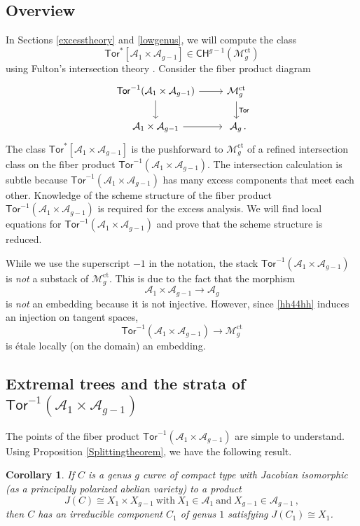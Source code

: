 \documentclass[11pt]{amsart}
\newtheorem{cor}[thm]{Corollary}
\theoremstyle{definition}
\newcommand{\M}{\mathcal{M}}
\newcommand{\A}{\mathcal{A}}
\newcommand{\CH}{\mathsf{CH}}
\DeclareMathOperator{\ct}{ct}
\newcommand{\Tor}{\mathsf{Tor}}
\begin{document}
{\subsection{Overview} In Sections \ref{excesstheory} and  \ref{lowgenus},  we will compute the class 
$$\Tor^*[\A_1\times \A_{g-1}]\in \CH^{g-1}(\M_g^{\ct})$$ using Fulton's intersection theory \cite {Fulton}. Consider the fiber product diagram
\[
\begin{tikzcd}
\Tor^{-1}(\A_1\times \A_{g-1}) \arrow[d] \arrow[r] & \M_g^{\ct} \arrow[d, "\Tor"] \\
\A_1\times \A_{g-1} \arrow[r]       & \ \A_g \, .                       
\end{tikzcd}
\]
The class $\Tor^*[\A_1\times \A_{g-1}]$ is the pushforward to $\M_g^{\ct}$ 
of a refined 
intersection class on the fiber product $\Tor^{-1}(\A_1\times\A_{g-1})$. 
The intersection calculation is subtle because
$\Tor^{-1}(\A_1\times\A_{g-1})$ has many excess components that meet each other.
Knowledge of the scheme structure of the fiber product $\Tor^{-1}(\A_1\times\A_{g-1})$
is required for the excess analysis.  We will find local equations for 
$\Tor^{-1}(\A_1\times \A_{g-1})$ and prove that  the scheme structure is reduced.

While we use the superscript $-1$ in the notation, the stack 
$\Tor^{-1}(\A_1\times \A_{g-1})$ is {\em not}
a substack of $\M_g^{\ct}$. This is due to the fact that the morphism 
\begin{equation}\label{hh44hh}
\A_1\times \A_{g-1} \rightarrow \A_g
\end{equation}
is {\em not} an embedding because it is not injective. However, since \eqref{hh44hh} induces an injection on tangent spaces,
$$\Tor^{-1}(\A_1\times \A_{g-1}) \rightarrow \M_g^{\ct}$$
is \'etale locally (on the domain) an embedding. 


\subsection{Extremal trees and the strata of $\Tor^{-1}(\A_1\times \A_{g-1})$ }\label{ets}

The points of the fiber product $\Tor^{-1}(\A_1\times \A_{g-1})$ are simple to understand.
Using Proposition \ref{Splittingtheorem}, we have the following result.
\begin{cor}\label{components}
If $C$ is a genus $g$ curve of compact type with Jacobian isomorphic (as 
 a principally polarized abelian variety) to a 
product
$$J(C)\cong X_1\times X_{g-1}  \ \text{with}\  X_1\in \A_1 \ \text{and}\  X_{g-1}\in \A_{g-1}\, ,$$
then $C$ has an irreducible component $C_1$ of genus $1$ satisfying
$J(C_1)\cong X_1$.
\end{cor}

}
\end{document}
